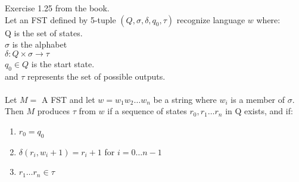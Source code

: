\begin{problem}{6} Exercise 1.25 from the book. \\

\noindent Let an FST defined by 5-tuple $(Q, \sigma, \delta, q_0, \tau)$ recognize language $w$ where: \\
Q is the set of states. \\
$\sigma$ is the alphabet \\
$\delta: Q \times \sigma \rightarrow \tau$ \\
$q_0 \in Q$ is the start state. \\
and $\tau$ represents the set of possible outputs. \\

 \\

\noindent Let $M =$ A FST and let $w = w_1w_2 \ldots w_n$ be a string where $w_i$ is a member of $\sigma$.
Then $M$ produces $\tau$ from $w$ if a sequence of states $r_0,r_1 \ldots r_n$ in Q exists, and if:
\begin{enumerate}
\item $r_0 = q_0$
\item $\delta(r_i, w_i + 1) = r_i + 1$ for $i = 0 \ldots n - 1$
\item $r_1 \ldots r_n \in \tau$
\end{enumerate}

\end{problem}
